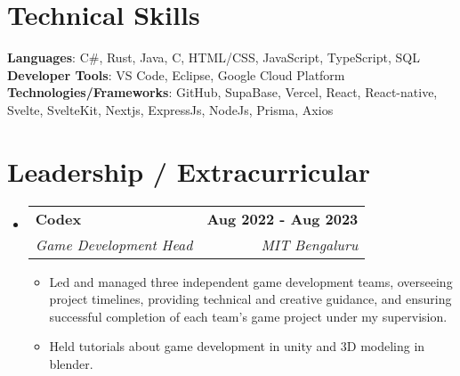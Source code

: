 \documentclass[letterpaper,11pt]{article}
\makeatletter
\newcommand{\resumeItem}[1]{
  \item\small{
    {#1 \vspace{-2pt}}
  }
}
\newcommand{\resumeSubheading}[4]{
  \vspace{-2pt}\item
    \begin{tabular*}{1.0\textwidth}[t]{l@{\extracolsep{\fill}}r}
      \textbf{#1} & \textbf{\small #2} \\
      \textit{\small#3} & \textit{\small #4} \\
    \end{tabular*}\vspace{-7pt}
}
\newcommand{\resumeSubHeadingListStart}{\begin{itemize}[leftmargin=0.0in, label={}]}
\newcommand{\resumeSubHeadingListEnd}{\end{itemize}}
\newcommand{\resumeItemListStart}{\begin{itemize}}
\newcommand{\resumeItemListEnd}{\end{itemize}\vspace{-5pt}}
\makeatother
\begin{document}
%
\section{Technical Skills}
 \begin{itemize}[leftmargin=0.15in, label={}]
    \small{\item{
     \textbf{Languages}{: C\#, Rust, Java, C, HTML/CSS, JavaScript, TypeScript, SQL} \\
     \textbf{Developer Tools}{: VS Code, Eclipse, Google Cloud Platform} \\
     \textbf{Technologies/Frameworks}{: GitHub, SupaBase, Vercel, React, React-native, Svelte, SvelteKit, Nextjs, ExpressJs, NodeJs, Prisma, Axios} \\
    }}
 \end{itemize}
 \vspace{-16pt}


\section{Leadership / Extracurricular}
    \resumeSubHeadingListStart
        \resumeSubheading{Codex}{Aug 2022 - Aug 2023}{Game Development Head}{MIT Bengaluru}
            \resumeItemListStart
                \resumeItem{Led and managed three independent game development teams, overseeing project timelines, providing technical and creative guidance, and ensuring successful completion of each team's game project under my supervision.}
                \resumeItem{Held tutorials about game development in unity and 3D modeling in blender.}
            \resumeItemListEnd
        
    \resumeSubHeadingListEnd
\end{document}
